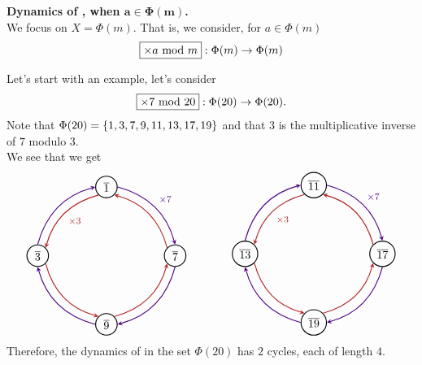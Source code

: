 \vspace*{1em}

{\bf Dynamics of , when $\mathbold{a\in \Phi(m)}$.}\\[1em] 
We focus on $X = \Phi(m)$. That is, we consider, for $a \in \Phi(m)$
\[\fbox{$\times a \text{ mod }{m}$}:\Phi(m) \to \Phi(m)\]

Let's start with an example, let's consider
\[\fbox{$\times 7 \text{ mod }{20}$}:\Phi(20) \to \Phi(20).\]
Note that $\Phi(20) = \left\{1,3,7,9,11,13,17,19\right\}$ and that $3$ is the multiplicative inverse of $7$ modulo $3$.\\[1em]
We see that we get
\[\begin{tikzpicture}[->,>=stealth,auto,node distance=3cm,
  thick,main node/.style={circle,draw}]

  \node[main node] (1) {$\overline{1}$};
  \node[main node] (2) [below right of=1] {$\overline{7}$};
  \node[main node] (3) [below left of=2] {$\overline{9}$};
  \node[main node] (4) [above left of=3] {$\overline{3}$};
\path[every node/.style={font=\sffamily\small}]
	(1.0) edge[indigo,bend left] node[] {\footnotesize$\times 7$} (2.90)
	(2.135) edge[firebrick,bend right] node[] {} (1.315)
	(2.270) edge[indigo,bend left] node[] {} (3.0)
	(3.45) edge[firebrick,bend right] node[] {} (2.225)
	(3.180) edge[indigo,bend left] node[] {} (4.270)
	(4.315) edge[firebrick,bend right] node[] {} (3.135)
  (4.90) edge[indigo,bend left] node[] {} (1.180)
  (1.225) edge[firebrick,bend right] node[] {\footnotesize$\times 3$} (4.45);
\end{tikzpicture}
\qquad\qquad
\begin{tikzpicture}[->,>=stealth,auto,node distance=3cm,
  thick,main node/.style={circle,draw}]

  \node[main node] (1) {$\overline{11}$};
  \node[main node] (2) [below right of=1] {$\overline{17}$};
  \node[main node] (3) [below left of=2] {$\overline{19}$};
  \node[main node] (4) [above left of=3] {$\overline{13}$};
\path[every node/.style={font=\sffamily\small}]
	(1.0) edge[indigo,bend left] node[] {\footnotesize$\times 7$} (2.90)
	(2.135) edge[firebrick,bend right] node[] {} (1.315)
	(2.270) edge[indigo,bend left] node[] {} (3.0)
	(3.45) edge[firebrick,bend right] node[] {} (2.225)
	(3.180) edge[indigo,bend left] node[] {} (4.270)
	(4.315) edge[firebrick,bend right] node[] {} (3.135)
  (4.90) edge[indigo,bend left] node[] {} (1.180)
  (1.225) edge[firebrick,bend right] node[] {\footnotesize$\times 3$} (4.45);
\end{tikzpicture}\]
Therefore, the dynamics of  in the set $\Phi(20)$ has $2$ cycles, each of length $4$.

